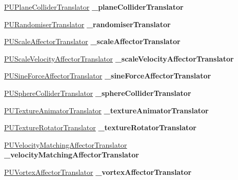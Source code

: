 \begin{DoxyCompactItemize}
\item 
\mbox{\label{classPUAffectorManager_ab070ca1695537c522771cd105a3e0a21}} 
\hyperlink{classPUPlaneColliderTranslator}{P\+U\+Plane\+Collider\+Translator} {\bfseries \+\_\+plane\+Collider\+Translator}
\item 
\mbox{\label{classPUAffectorManager_ad05259c96c8d6d1fa3ead1e0dada86a0}} 
\hyperlink{classPURandomiserTranslator}{P\+U\+Randomiser\+Translator} {\bfseries \+\_\+randomiser\+Translator}
\item 
\mbox{\label{classPUAffectorManager_a07ca967f51b8fa2ba0a05d5443870a21}} 
\hyperlink{classPUScaleAffectorTranslator}{P\+U\+Scale\+Affector\+Translator} {\bfseries \+\_\+scale\+Affector\+Translator}
\item 
\mbox{\label{classPUAffectorManager_aec5f5308f8a06eab06ca034c38f824e7}} 
\hyperlink{classPUScaleVelocityAffectorTranslator}{P\+U\+Scale\+Velocity\+Affector\+Translator} {\bfseries \+\_\+scale\+Velocity\+Affector\+Translator}
\item 
\mbox{\label{classPUAffectorManager_add9f9deaed921bda9be3356094d4ea76}} 
\hyperlink{classPUSineForceAffectorTranslator}{P\+U\+Sine\+Force\+Affector\+Translator} {\bfseries \+\_\+sine\+Force\+Affector\+Translator}
\item 
\mbox{\label{classPUAffectorManager_acea26f600cbcf5cdf9f43527c053dd4a}} 
\hyperlink{classPUSphereColliderTranslator}{P\+U\+Sphere\+Collider\+Translator} {\bfseries \+\_\+sphere\+Collider\+Translator}
\item 
\mbox{\label{classPUAffectorManager_a01a8c154135537c01aeceb0d614d203b}} 
\hyperlink{classPUTextureAnimatorTranslator}{P\+U\+Texture\+Animator\+Translator} {\bfseries \+\_\+texture\+Animator\+Translator}
\item 
\mbox{\label{classPUAffectorManager_a7ccff26e36968c637cb3976b72e30ddf}} 
\hyperlink{classPUTextureRotatorTranslator}{P\+U\+Texture\+Rotator\+Translator} {\bfseries \+\_\+texture\+Rotator\+Translator}
\item 
\mbox{\label{classPUAffectorManager_afd1ebc5bfabf4522969c615cd72ba8fa}} 
\hyperlink{classPUVelocityMatchingAffectorTranslator}{P\+U\+Velocity\+Matching\+Affector\+Translator} {\bfseries \+\_\+velocity\+Matching\+Affector\+Translator}
\item 
\mbox{\label{classPUAffectorManager_a6f8edb126ec29bd70f45caa364d3225b}} 
\hyperlink{classPUVortexAffectorTranslator}{P\+U\+Vortex\+Affector\+Translator} {\bfseries \+\_\+vortex\+Affector\+Translator}
\end{DoxyCompactItemize}


